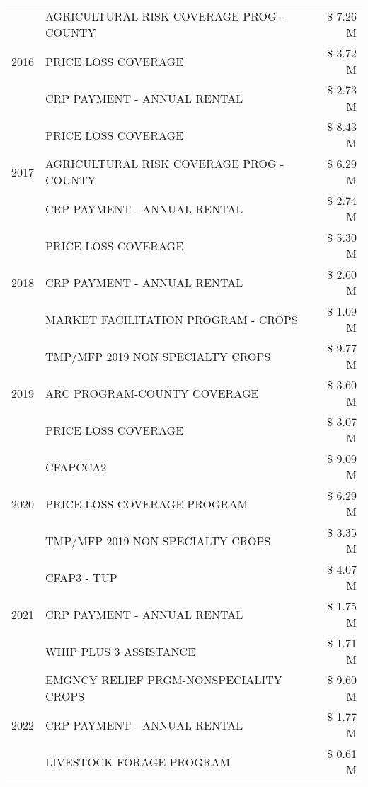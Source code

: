 \begin{tabular}{llr}
\cline{1-3}
\multirow[t]{3}{*}{2016} & AGRICULTURAL RISK COVERAGE PROG - COUNTY & \$ 7.26 M \\
 & PRICE LOSS COVERAGE & \$ 3.72 M \\
 & CRP PAYMENT - ANNUAL RENTAL & \$ 2.73 M \\
\cline{1-3}
\multirow[t]{3}{*}{2017} & PRICE LOSS COVERAGE & \$ 8.43 M \\
 & AGRICULTURAL RISK COVERAGE PROG - COUNTY & \$ 6.29 M \\
 & CRP PAYMENT - ANNUAL RENTAL & \$ 2.74 M \\
\cline{1-3}
\multirow[t]{3}{*}{2018} & PRICE LOSS COVERAGE & \$ 5.30 M \\
 & CRP PAYMENT - ANNUAL RENTAL & \$ 2.60 M \\
 & MARKET FACILITATION PROGRAM - CROPS & \$ 1.09 M \\
\cline{1-3}
\multirow[t]{3}{*}{2019} & TMP/MFP 2019 NON SPECIALTY CROPS & \$ 9.77 M \\
 & ARC PROGRAM-COUNTY COVERAGE & \$ 3.60 M \\
 & PRICE LOSS COVERAGE & \$ 3.07 M \\
\cline{1-3}
\multirow[t]{3}{*}{2020} & CFAPCCA2 & \$ 9.09 M \\
 & PRICE LOSS COVERAGE PROGRAM & \$ 6.29 M \\
 & TMP/MFP 2019 NON SPECIALTY CROPS & \$ 3.35 M \\
\cline{1-3}
\multirow[t]{3}{*}{2021} & CFAP3 - TUP & \$ 4.07 M \\
 & CRP PAYMENT - ANNUAL RENTAL & \$ 1.75 M \\
 & WHIP PLUS 3 ASSISTANCE & \$ 1.71 M \\
\cline{1-3}
\multirow[t]{3}{*}{2022} & EMGNCY RELIEF PRGM-NONSPECIALITY CROPS & \$ 9.60 M \\
 & CRP PAYMENT - ANNUAL RENTAL & \$ 1.77 M \\
 & LIVESTOCK FORAGE PROGRAM & \$ 0.61 M \\
\cline{1-3}
\bottomrule
\end{tabular}
